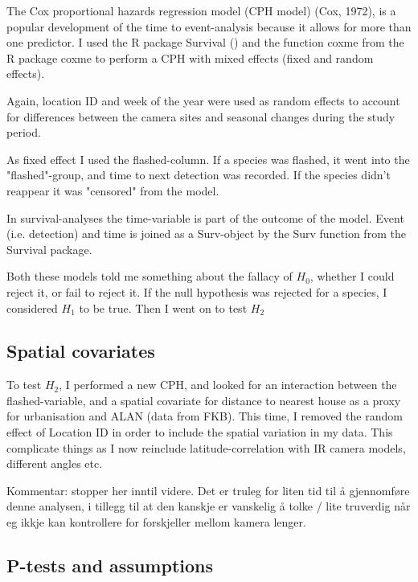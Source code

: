 The Cox proportional hazards regression model (CPH model) (Cox, 1972), is a popular development of the time to event-analysis because it allows for more than one predictor. I used the R package Survival (\cite{survival-package}) and the function coxme from the R package coxme \cite{coxme-package} to perform a CPH with mixed effects (fixed and random effects). 

Again, location ID and week of the year were used as random effects to account for differences between the camera sites and seasonal changes during the study period.


As fixed effect I used the flashed-column.
If a species was flashed, it went into the "flashed"-group, and time to next detection was recorded. 
If the species didn't reappear it was "censored" from the model.


In survival-analyses the time-variable is part of the outcome of the model. Event (i.e. detection) and time is joined as a Surv-object by the Surv function from the Survival package. 


Both these models told me something about the fallacy of $H_0$, whether I could reject it, or fail to reject it.
If the null hypothesis was rejected for a species, I considered $H_1$ to be true. Then I went on to test $H_2$


	\subsection*{Spatial covariates}


To test $H_2$, I performed a new CPH, and looked for an interaction between the flashed-variable, and a spatial covariate for distance to nearest house as a proxy for urbanisation and ALAN (data from FKB). 
This time, I removed the random effect of Location ID in order to include the spatial variation in my data. This complicate things as I now reinclude latitude-correlation with IR camera models, different angles etc.


Kommentar: stopper her inntil videre. Det er truleg for liten tid til å gjennomføre denne analysen, i tillegg til at den kanskje er vanskelig å tolke / lite truverdig når eg ikkje kan kontrollere for forskjeller mellom kamera lenger.




	\subsection*{P-tests and assumptions}

